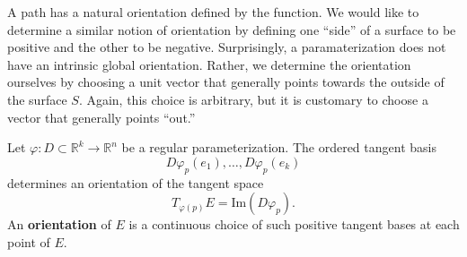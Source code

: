 	A path has a natural orientation defined by the function. We would like to determine a similar notion of orientation by defining one ``side'' of a surface to be positive and the other to be negative. Surprisingly, a paramaterization does not have an intrinsic global orientation. Rather, we determine the orientation ourselves by choosing a unit vector that generally points towards the outside of the surface $S$. Again, this choice is arbitrary, but it is customary to choose a vector that generally points ``out.''
			
	\begin{definition}
		Let $\varphi : D \subset \mathbb{R}^k \to \mathbb{R}^n$ be a regular parameterization. The ordered tangent basis
		\begin{equation}
			D\varphi_p(e_1), \dots, D\varphi_p(e_k)
		\end{equation}
		determines an orientation of the tangent space
		\begin{equation}
			T_{\varphi(p)}E = \mathrm{Im}(D\varphi_p).
		\end{equation}
		An \textbf{orientation} of $E$ is a continuous choice of such positive tangent bases at each point of $E$.
	\end{definition}
			
